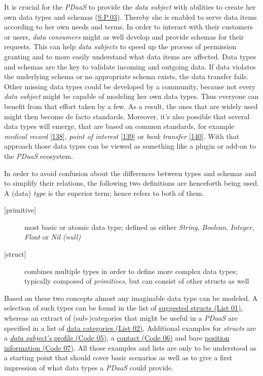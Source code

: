 \documentclass[12pt,english,a4paper,titlepage,cleardoublepage=empty,dottedtoc]{report}
\begin{document}
It is crucial for the \emph{PDaaS} to provide the \emph{data subject}
with abilities to create her own data types and schemas
(\protect\hyperlink{sp03}{S.P.03}). Thereby she is enabled to serve data
items according to her own needs and terms. In order to interact with
their customers or users, \emph{data consumers} might as well develop
and provide schemas for their requests. This can help \emph{data
subjects} to speed up the process of permission granting and to more
easily understand what data items are affected. Data types and schemas
are the key to validate incoming and outgoing data. If data violates the
underlying schema or no appropriate schema exists, the data transfer
fails. Other missing data types could be developed by a community,
because not every \emph{data subject} might be capable of modeling her
own data types. Thus everyone can benefit from that effort taken by a
few. As a result, the ones that are widely used might then become de
facto standards. Moreover, it's also possible that several data types
will emerge, that are based on common standards, for example
\emph{medical record}
{[}\protect\hyperlink{ref-web_spec_data-schemas_ehr}{138}{]},
\emph{point of interest}
{[}\protect\hyperlink{ref-web_spec_data-schemas_poi}{139}{]} or
\emph{bank transfer}
{[}\protect\hyperlink{ref-web_spec_data-schemas_bank-transfer}{140}{]}.
With that approach those data types can be viewed as something like a
plugin or add-on to the \emph{PDaaS} ecosystem.

In order to avoid confusion about the differences between types and
schemas and to simplify their relations, the following two definitions
are henceforth being used. A (data) \emph{type} is the superior term;
hence refers to both of them.

\begin{description}
\item[{[}primitive{]}]
most basic or atomic data type; defined as either \emph{String},
\emph{Boolean}, \emph{Integer}, \emph{Float} or \emph{Nil (null)}
\item[{[}struct{]}]
combines multiple types in order to define more complex data types;
typically composed of \emph{primitives}, but can consist of other
structs as well
\end{description}

Based on these two concepts almost any imaginable data type can be
modeled. A selection of such types can be found in the list of
\protect\hyperlink{list-01_suggested-structs}{suggested structs (List
01)}, whereas an extract of (sub-)categories that might be useful in a
\emph{PDaaS} are specified in a list of
\protect\hyperlink{list-02_data-categories}{data categories (List 02)}.
Additional examples for \emph{structs} are a
\protect\hyperlink{code-05_struct_profile}{\emph{data subject's} profile
(Code 05)}, a \protect\hyperlink{code-06_struct_contact}{contact (Code
06)} and bare \protect\hyperlink{code-07_struct_position}{position
information (Code 07)}. All those examples and lists are only to be
understood as a starting point that should cover basic scenarios as well
as to give a first impression of what data types a \emph{PDaaS} could
provide.
\end{document}
